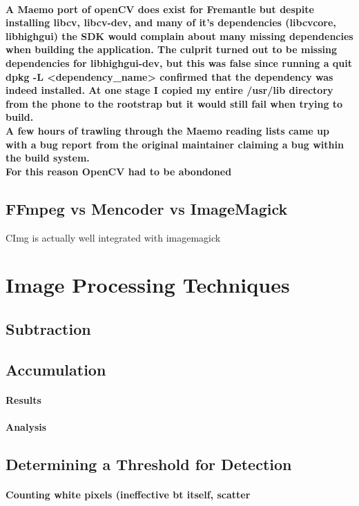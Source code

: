 \documentclass[11pt]{article} %
\begin{document}
\paragraph{
A Maemo port of openCV does exist for Fremantle \cite{libcv} but despite installing libcv, libcv-dev, and many of it's dependencies (libcvcore, libhighgui) the SDK would complain about many missing dependencies when building the application. The culprit turned out to be missing dependencies for libhighgui-dev, but this was false since running a quit dpkg -L <dependency\_name> confirmed that the dependency was indeed installed. At one stage I copied my entire /usr/lib directory from the phone to the rootstrap but it would still fail when trying to build.\\
A few hours of trawling through the Maemo reading lists came up with a bug report \cite{highgui-dev} from the original maintainer claiming a bug within the build system.\\
For this reason OpenCV had to be abondoned
}


\subsection{FFmpeg vs Mencoder vs ImageMagick}{CImg is actually well integrated with imagemagick}
\section{Image Processing Techniques}
\subsection{Subtraction}
\subsection{Accumulation}
\paragraph{Results}
\paragraph{Analysis}
\subsection{Determining a Threshold for Detection}
\paragraph{Counting white pixels (ineffective bt itself, scatter}
\end{document}
